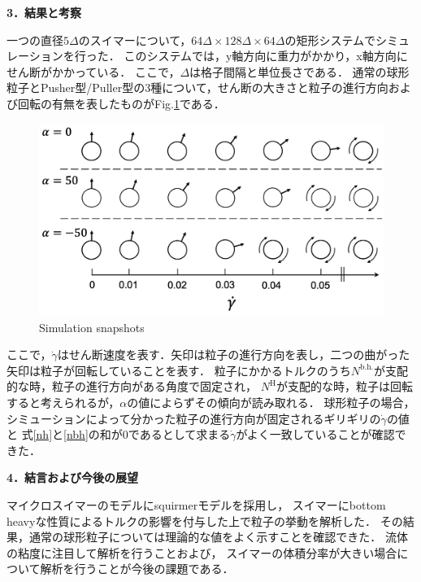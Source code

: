 \documentclass[twocolumns,10pt,a4j]{jarticle}
\begin{document}
  \noindent
  {\bf \large 3．結果と考察}
  \par
一つの直径$5\Delta$のスイマーについて，$64\Delta \times 128\Delta \times 64\Delta$の矩形システムでシミュレーションを行った．
このシステムでは，y軸方向に重力がかかり，x軸方向にせん断がかかっている．
ここで，$\Delta$は格子間隔と単位長さである．
通常の球形粒子とPusher型/Puller型の3種について，せん断の大きさと粒子の進行方向および回転の有無を表したものがFig.\ref{snapshots}である．
  \vspace{-3truemm}
  \begin{figure}[h]
    \hspace{-3truemm}
    \centering
    \includegraphics[width=80truemm]{./images/rotation.png}
    \vspace{-6truemm}
    \hspace{-2truemm}
    \caption{Simulation snapshots}
    \label{snapshots}
  \end{figure}
  \vspace{-3truemm}

  \noindent
ここで，$\dot{\gamma}$はせん断速度を表す．矢印は粒子の進行方向を表し，二つの曲がった矢印は粒子が回転していることを表す．
粒子にかかるトルクのうち$N^\mathrm{b.h.}$が支配的な時，粒子の進行方向がある角度で固定され，
$N^\mathrm{H}$が支配的な時，粒子は回転すると考えられるが，$\alpha$の値によらずその傾向が読み取れる．
球形粒子の場合，シミューションによって分かった粒子の進行方向が固定されるギリギリの$\dot{\gamma}$の値と
式\eqref{nh}と\eqref{nbh}の和が0であるとして求まる$\dot{\gamma}$がよく一致していることが確認できた．


  \noindent
  \textbf{\large 4．結言および今後の展望}
  \par
マイクロスイマーのモデルにsquirmerモデルを採用し，
スイマーにbottom heavyな性質によるトルクの影響を付与した上で粒子の挙動を解析した．
その結果，通常の球形粒子については理論的な値をよく示すことを確認できた．
流体の粘度に注目して解析を行うことおよび，
スイマーの体積分率が大きい場合について解析を行うことが今後の課題である．
  \vspace{-7.5truemm}
\end{document}
